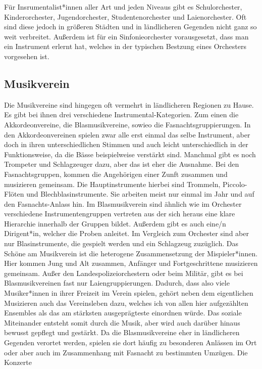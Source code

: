 Für Insrumentalist*innen aller Art und jeden Niveaus gibt es Schulorchester,
Kinderorchester, Jugendorchester, Studentenorchester und Laienorchester. Oft
sind diese jedoch in größeren Städten und in ländlicheren Gegenden nicht ganz so
weit verbreitet. Außerdem ist für ein Sinfonieorchester vorausgesetzt, dass man
ein Instrument erlernt hat, welches in der typischen Bestzung eines Orchesters
vorgesehen ist. 

\subsection{Musikverein}
Die Musikvereine sind hingegen oft vermehrt in ländlicheren Regionen zu Hause.
Es gibt bei ihnen drei verschiedene Instrumental-Kategorien. Zum einen die
Akkordeonvereine, die Blasmusikvereine, sowieo die Fasnachtsgruppierungen. In
den Akkordeonvereinen spielen zwar alle erst einmal das selbe Instrument, aber
doch in ihren unterschiedlichen Stimmen und auch leicht unterschiedlich in der
Funktionsweise, da die Bässe beispielweise verstärkt sind. Manchmal gibt es noch
Trompeter und Schlagzeuger dazu, aber das ist eher die Ausnahme. Bei den
Fasnachtsgruppen, kommen die Angehörigen einer Zunft zusammen und musizieren
gemeinsam. Die Hauptinstrumente hierbei sind Trommeln, Piccolo-Flöten und
Blechblasinstrumente. Sie arbeiten meist nur einmal im Jahr und auf den
Fasnachts-Anlass hin. Im Blasmusikverein sind ähnlich wie im Orchester
verschiedene Instrumentengruppen vertreten aus der sich heraus eine klare
Hierarchie innerhalb der Gruppen bildet. Außerdem gibt es auch eine/n
Dirigent*in, welcher die Proben anleitet. Im Vergleich zum Orchester sind aber
nur Blasinstrumente, die gespielt werden und ein Schlagzeug zuzüglich. Das
Schöne am Musikverein ist die heterogene Zusammensetzung der Mispieler*innen.
Hier kommen Jung und Alt zusammen, Anfänger und Fortgeschrittene musizieren
gemeinsam. Außer den Landespolizeiorchestern oder beim Militär, gibt es bei
Blasmusikvereinen fast nur Laiengruppierungen. Dadurch, dass also viele
Musiker*innen in ihrer Freizeit im Verein spielen, gehört neben dem eigentlichen
Musizieren auch das Vereinsleben dazu, welches ich von allen hier aufgezählten
Ensembles als das am stärksten ausgeprägteste einordnen würde. Das soziale
Miteinander entsteht somit durch die Musik, aber wird auch darüber hinaus
bewusst gepflegt und gestärkt. Da die Blasmusikvereine eher in ländlicheren
Gegenden verortet werden, spielen sie dort häufig zu besonderen Anlässen im Ort
oder aber auch im Zusammenhang mit Fasnacht zu bestimmten Umzügen. Die Konzerte
